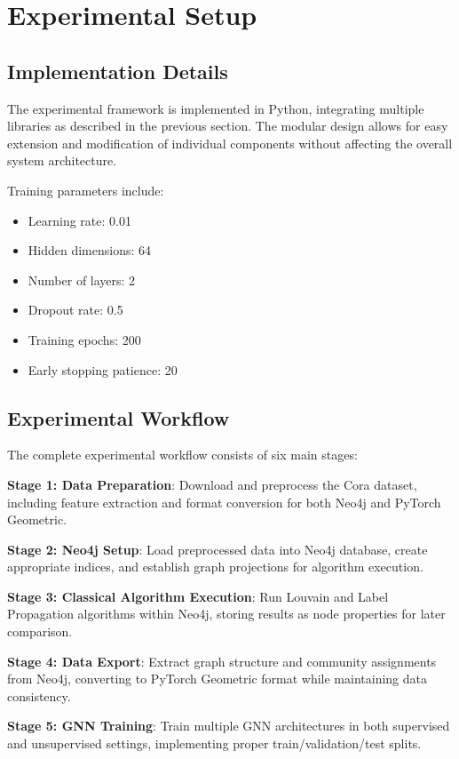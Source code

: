 \documentclass[conference]{IEEEtran}
\begin{document}
\section{Experimental Setup}

\subsection{Implementation Details}

The experimental framework is implemented in Python, integrating multiple libraries as described in the previous section. The modular design allows for easy extension and modification of individual components without affecting the overall system architecture.

Training parameters include:
\begin{itemize}
    \item Learning rate: 0.01
    \item Hidden dimensions: 64
    \item Number of layers: 2
    \item Dropout rate: 0.5
    \item Training epochs: 200
    \item Early stopping patience: 20
\end{itemize}

\subsection{Experimental Workflow}

The complete experimental workflow consists of six main stages:

\textbf{Stage 1: Data Preparation}: Download and preprocess the Cora dataset, including feature extraction and format conversion for both Neo4j and PyTorch Geometric.

\textbf{Stage 2: Neo4j Setup}: Load preprocessed data into Neo4j database, create appropriate indices, and establish graph projections for algorithm execution.

\textbf{Stage 3: Classical Algorithm Execution}: Run Louvain and Label Propagation algorithms within Neo4j, storing results as node properties for later comparison.

\textbf{Stage 4: Data Export}: Extract graph structure and community assignments from Neo4j, converting to PyTorch Geometric format while maintaining data consistency.

\textbf{Stage 5: GNN Training}: Train multiple GNN architectures in both supervised and unsupervised settings, implementing proper train/validation/test splits.
\end{document}
